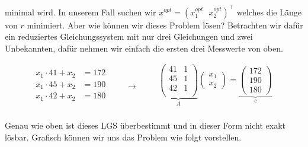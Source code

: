 \vspace{0.25\baselineskip}

minimal wird. In unserem Fall suchen wir \( x^{opt} = (x_1^{opt} \ \ \ x_2^{opt})^\top\) welches die Länge von \( r \) minimiert. Aber wie können wir dieses Problem lösen? Betrachten wir dafür ein reduziertes Gleichungssystem mit nur drei Gleichungen und zwei Unbekannten, dafür nehmen wir einfach die ersten drei Messwerte von oben. 

\begin{equation*}
    \begin{aligned}
        x_1\cdot 41 + x_2&= 172 \\
        x_1\cdot 45 + x_2&= 190 \\
        x_1\cdot 42 + x_2&= 180 \\
    \end{aligned} \qquad \rightarrow \qquad
    \begin{aligned}
        \underbrace{
        \begin{pmatrix}
            41 & 1 \\
            45 & 1 \\
            42 & 1 \\
        \end{pmatrix}}_{A}
        \begin{pmatrix}
            x_1\\ x_2
        \end{pmatrix}
        =
        \underbrace{
        \begin{pmatrix}
            172 \\ 190 \\ 180
        \end{pmatrix}}_{c} \\
    \end{aligned}
\end{equation*}

Genau wie oben ist dieses LGS überbestimmt und in dieser Form nicht exakt lösbar. Grafisch können wir uns das Problem wie folgt vorstellen. 

\newpage

